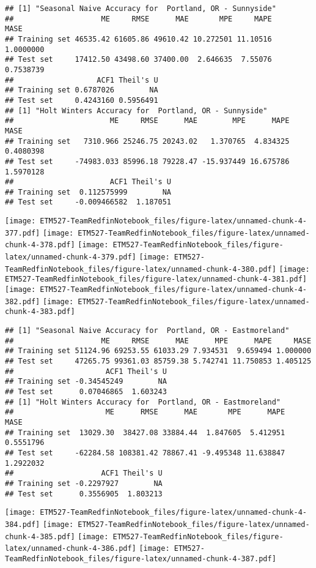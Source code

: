 \documentclass[]{article}
\begin{document}
\begin{verbatim}
## [1] "Seasonal Naive Accuracy for  Portland, OR - Sunnyside"
##                    ME     RMSE      MAE       MPE     MAPE      MASE
## Training set 46535.42 61605.86 49610.42 10.272501 11.10516 1.0000000
## Test set     17412.50 43498.60 37400.00  2.646635  7.55076 0.7538739
##                   ACF1 Theil's U
## Training set 0.6787026        NA
## Test set     0.4243160 0.5956491
## [1] "Holt Winters Accuracy for  Portland, OR - Sunnyside"
##                      ME     RMSE      MAE        MPE      MAPE      MASE
## Training set   7310.966 25246.75 20243.02   1.370765  4.834325 0.4080398
## Test set     -74983.033 85996.18 79228.47 -15.937449 16.675786 1.5970128
##                      ACF1 Theil's U
## Training set  0.112575999        NA
## Test set     -0.009466582  1.187051
\end{verbatim}

\texttt{[image: ETM527-TeamRedfinNotebook\_files/figure-latex/unnamed-chunk-4-377.pdf]}
\texttt{[image: ETM527-TeamRedfinNotebook\_files/figure-latex/unnamed-chunk-4-378.pdf]}
\texttt{[image: ETM527-TeamRedfinNotebook\_files/figure-latex/unnamed-chunk-4-379.pdf]}
\texttt{[image: ETM527-TeamRedfinNotebook\_files/figure-latex/unnamed-chunk-4-380.pdf]}
\texttt{[image: ETM527-TeamRedfinNotebook\_files/figure-latex/unnamed-chunk-4-381.pdf]}
\texttt{[image: ETM527-TeamRedfinNotebook\_files/figure-latex/unnamed-chunk-4-382.pdf]}
\texttt{[image: ETM527-TeamRedfinNotebook\_files/figure-latex/unnamed-chunk-4-383.pdf]}

\begin{verbatim}
## [1] "Seasonal Naive Accuracy for  Portland, OR - Eastmoreland"
##                    ME     RMSE      MAE      MPE      MAPE     MASE
## Training set 51124.96 69253.55 61033.29 7.934531  9.659494 1.000000
## Test set     47265.75 99361.03 85759.38 5.742741 11.750853 1.405125
##                     ACF1 Theil's U
## Training set -0.34545249        NA
## Test set      0.07046865  1.603243
## [1] "Holt Winters Accuracy for  Portland, OR - Eastmoreland"
##                     ME      RMSE      MAE       MPE      MAPE      MASE
## Training set  13029.30  38427.08 33884.44  1.847605  5.412951 0.5551796
## Test set     -62284.58 108381.42 78867.41 -9.495348 11.638847 1.2922032
##                    ACF1 Theil's U
## Training set -0.2297927        NA
## Test set      0.3556905  1.803213
\end{verbatim}

\texttt{[image: ETM527-TeamRedfinNotebook\_files/figure-latex/unnamed-chunk-4-384.pdf]}
\texttt{[image: ETM527-TeamRedfinNotebook\_files/figure-latex/unnamed-chunk-4-385.pdf]}
\texttt{[image: ETM527-TeamRedfinNotebook\_files/figure-latex/unnamed-chunk-4-386.pdf]}
\texttt{[image: ETM527-TeamRedfinNotebook\_files/figure-latex/unnamed-chunk-4-387.pdf]}
\end{document}

